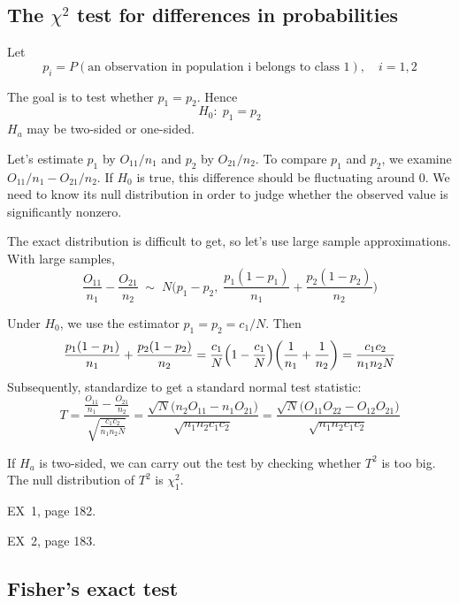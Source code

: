\documentclass[12pt]{article}
\begin{document}


\subsection{The $\chi^2$ test for differences in probabilities}

Let
\[
p_i = P(\text{an observation in population i belongs to class 1}),
\quad
i=1,2
\]

The goal is to test whether $p_1 = p_2$. Hence
\[
H_0:\; p_1 = p_2
\]
$H_a$ may be two-sided or one-sided.

Let's estimate $p_1$ by $O_{11}/n_1$
and $p_2$ by $O_{21}/n_2$.
To compare $p_1$ and $p_2$,
we examine $O_{11}/n_1 - O_{21}/n_2$.
If $H_0$ is true, this difference should be fluctuating around 0.
We need to know its null distribution in order to judge
whether the observed value is significantly nonzero.

The exact distribution is difficult to get,
so let's use large sample approximations.
With large samples,
\[
\frac{O_{11}}{n_1} - \frac{O_{21}}{n_2}
\;\sim\;
    N\biggl(p_1 - p_2,\;
        \frac{p_1(1-p_1)}{n_1} + \frac{p_2(1-p_2)}{n_2}
        \biggr)
\]

Under $H_0$, we use the estimator
$p_1 = p_2 = c_1 / N$.
Then
\[
\frac{p_1(1-p_1)}{n_1} + \frac{p_2(1-p_2)}{n_2}
= \frac{c_1}{N}\Bigl(1 - \frac{c_1}{N}\Bigr)
    \biggl(\frac{1}{n_1} + \frac{1}{n_2}\biggr)
= \frac{c_1c_2}{n_1n_2N}
\]
Subsequently,
standardize to get a standard normal test statistic:
\[
T
= \frac{\frac{O_{11}}{n_1} - \frac{O_{21}}{n_2}}
    {\sqrt{\frac{c_1c_2}{n_1n_2N}}}
= \frac{\sqrt{N}\bigl(n_2 O_{11} - n_1 O_{21}\bigr)}
    {\sqrt{n_1n_2c_1c_2}}
= \frac{\sqrt{N}\bigl(O_{11}O_{22} - O_{12}O_{21}\bigr)}
    {\sqrt{n_1n_2c_1c_2}}
\]

If $H_a$ is two-sided,
we can carry out the test by checking
whether $T^2$ is too big.
The null distribution of $T^2$ is $\chi^2_1$.

\example EX~1, page 182.

\example EX~2, page 183.

\subsection{Fisher's exact test}
\end{document}
